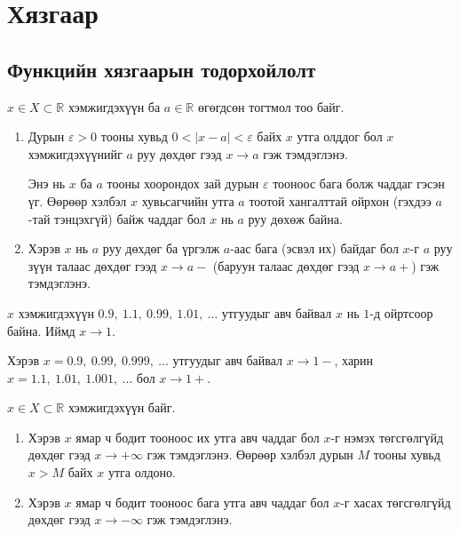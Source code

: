 \providecommand{\R}{\mathbb{R}}
\providecommand{\N}{\mathbb{N}}
\providecommand{\tg}{\operatorname{tg}}

\chapter{Хязгаар}
\section{Функцийн хязгаарын тодорхойлолт}
\begin{definition}
$x \in X \subset \mathbb{R}$ хэмжигдэхүүн ба $a \in \mathbb{R}$ өгөгдсөн тогтмол тоо байг.
\begin{enumerate}
\item Дурын $\varepsilon>0$ тооны хувьд $0<|x-a|<\varepsilon$ байх $x$ утга олддог бол $x$ хэмжигдэхүүнийг $a$ руу дөхдөг гээд $x \to a$ гэж тэмдэглэнэ.

Энэ нь $x$ ба $a$ тооны хоорондох зай дурын $\varepsilon$ тооноос бага болж чаддаг гэсэн үг.
Өөрөөр хэлбэл $x$ хувьсагчийн утга $a$ тоотой хангалттай ойрхон (гэхдээ $a$-тай тэнцэхгүй) байж чаддаг бол $x$ нь $a$ руу дөхөж байна.
\item Хэрэв $x$ нь $a$ руу дөхдөг ба үргэлж $a$-аас бага (эсвэл их) байдаг бол $x$-г $a$ руу зүүн талаас дөхдөг гээд $x \to a-$ (баруун талаас дөхдөг гээд $x \to a+$) гэж тэмдэглэнэ.
\end{enumerate}
\end{definition}
\begin{example}
$x$ хэмжигдэхүүн $0.9,\ 1.1,\ 0.99,\ 1.01,\ \ldots$ утгуудыг авч байвал $x$ нь $1$-д ойртсоор байна. Иймд $x \to 1$.

Хэрэв $x=0.9,\ 0.99,\ 0.999,\ \ldots$ утгуудыг авч байвал $x \to 1-$, харин $x=1.1,\ 1.01,\ 1.001,\ \ldots$ бол $x \to 1+$.
\end{example}
\begin{definition}
$x \in X \subset \mathbb{R}$ хэмжигдэхүүн байг.
\begin{enumerate}
\item Хэрэв $x$ ямар ч бодит тооноос их утга авч чаддаг бол $x$-г нэмэх төгсгөлгүйд дөхдөг гээд $x \to +\infty$ гэж тэмдэглэнэ.
Өөрөөр хэлбэл дурын $M$ тооны хувьд $x > M$ байх $x$ утга олдоно.
\item Хэрэв $x$ ямар ч бодит тооноос бага утга авч чаддаг бол $x$-г хасах төгсгөлгүйд дөхдөг гээд $x \to -\infty$ гэж тэмдэглэнэ.
\end{enumerate}
\end{definition}

